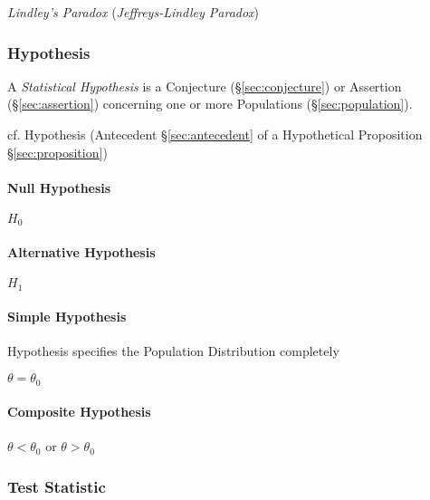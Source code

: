 \emph{Lindley's Paradox} (\emph{Jeffreys-Lindley Paradox})



\subsubsection{Hypothesis}\label{sec:hypothesis}

A \emph{Statistical Hypothesis} is a Conjecture (\S\ref{sec:conjecture}) or
Assertion (\S\ref{sec:assertion}) concerning one or more Populations
(\S\ref{sec:population}).

cf. Hypothesis (Antecedent \S\ref{sec:antecedent} of a Hypothetical Proposition
\S\ref{sec:proposition})



\paragraph{Null Hypothesis}\label{sec:null_hypothesis}\hfill

$H_0$



\paragraph{Alternative Hypothesis}\label{sec:alternative_hypothesis}\hfill

$H_1$



\paragraph{Simple Hypothesis}\label{sec:simple_hypothesis}\hfill

Hypothesis specifies the Population Distribution completely

$\theta = \theta_0$



\paragraph{Composite Hypothesis}\label{sec:composite_hypothesis}\hfill

$\theta < \theta_0$ or $\theta > \theta_0$



\subsubsection{Test Statistic}\label{sec:test_statistic}

